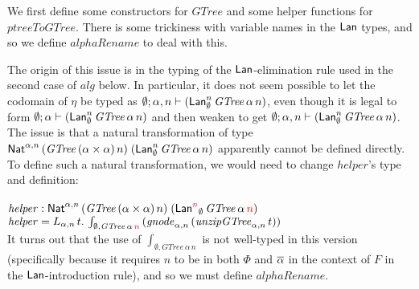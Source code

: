 \documentclass[acmsmall,review,anonymous]{acmart}
\theoremstyle{definition}
\begin{document}
We first define some constructors for $\mathit{GTree}$ and some helper functions for 
$\mathit{ptreeToGTree}$. There is some trickiness with variable names in the $\mathsf{Lan}$ types, and so we define
$\mathit{alphaRename}$ to deal with this. 

The origin of this issue is in the typing of the 
$\mathsf{Lan}$-elimination rule used in the second case of $alg$ below. In particular, it does
not seem possible to let the codomain of $\eta$ be typed as $\emptyset; \alpha, n \vdash (\mathsf{Lan}^n_\emptyset \, \mathit{GTree}\,\alpha\,n)$,
even though it is legal to form $\emptyset; \alpha \vdash (\mathsf{Lan}^n_\emptyset \,\mathit{GTree}\,\alpha\,n)$ and 
then weaken to get  $\emptyset; \alpha, n \vdash (\mathsf{Lan}^n_\emptyset \, \mathit{GTree}\,\alpha\,n)$. The issue
is that a natural transformation of type 
$\mathsf{Nat}^{\alpha,n}\,
  (\mathit{GTree}\,(\alpha\times\alpha)\,n) \;(\mathsf{Lan}^n_\emptyset\,\mathit{GTree}\,\alpha\,n)
  $ 
apparently cannot be defined directly.
To define such a natural transformation, we would need to change $\mathit{helper}$'s type and definition:  \\ \\
  $\mathit{helper} : \mathsf{Nat}^{\alpha,n}\,
  (\mathit{GTree}\,(\alpha\times\alpha)\,n) \;(\mathsf{Lan}^{\color{red}n}_\emptyset\,\mathit{GTree}\,\alpha\,{\color{red}n})$ \\
  $\mathit{helper} = L_{\alpha, n} \, t. \, \int_{\emptyset, \mathit{GTree}\,\alpha\,{\color{red}n}}  \,  (\mathit{gnode}_{\alpha, n}  \,  (\mathit{unzipGTree}_{\alpha, n} \, t)) $ \\

It turns out that the use of $\int_{\emptyset, \mathit{GTree}\,\alpha\,n}$ is not well-typed in this 
version (specifically because it requires $n$ to be in both $\Phi$ and $\overline{\alpha}$ in the context of $F$
in the $\mathsf{Lan}$-introduction rule), and so we must define $\mathit{alphaRename}$.
\end{document}
